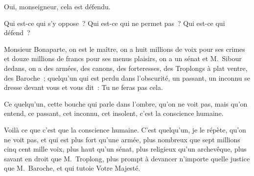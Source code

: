 \documentclass[french,twoside]{book} %
\begin{document}
Oui, monseigneur, cela est défendu.\par
Qui est-ce qui s’y oppose ? Qui est-ce qui ne permet pas ? Qui est-ce qui défend ?\par
Monsieur Bonaparte, on est le maître, on a huit millions de voix pour ses crimes et douze millions de francs pour ses menus plaisirs, on a un sénat et M. Sibour dedans, on a des armées, des canons, des forteresses, des Troplongs à plat ventre, des Baroche ; quelqu’un qui est perdu dans l’obscurité, un passant, un inconnu se dresse devant vous et vous dit : Tu ne feras pas cela.\par
Ce quelqu’un, cette bouche qui parle dans l’ombre, qu’on ne voit pas, mais qu’on entend, ce passant, cet inconnu, cet insolent, c’est la conscience humaine.\par
Voilà ce que c’est que la conscience humaine. C’est quelqu’un, je le répète, qu’on ne voit pas, et qui est plus fort qu’une armée, plus nombreux que sept millions cinq cent mille voix, plus haut qu’un sénat, plus religieux qu’un archevêque, plus savant en droit que M. Troplong, plus prompt à devancer n’importe quelle justice que M. Baroche, et qui tutoie Votre Majesté.
\end{document}
